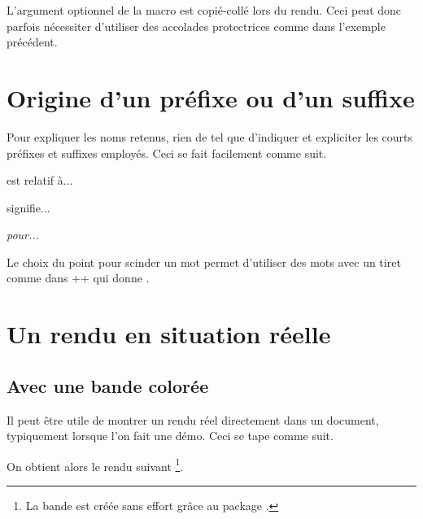 \begin{bdocwarn}
    L'argument optionnel de la macro  est copié-collé lors du rendu. Ceci peut donc parfois nécessiter d'utiliser des accolades protectrices comme dans l'exemple précédent.
\end{bdocwarn}




\section{Origine d'un préfixe ou d'un suffixe}

Pour expliquer les noms retenus, rien de tel que d'indiquer et expliciter les courts préfixes et suffixes employés. Ceci se fait facilement comme suit.

\begin{bdoclatex}[sbs]
 est relatif à...

 signifie...

\emph{ pour...}
\end{bdoclatex}


\begin{bdocrem}
    Le choix du point pour scinder un mot permet d'utiliser des mots avec un tiret comme dans \bdocinlatex++ qui donne .
\end{bdocrem}


\section{Un rendu en situation réelle} \label{bdoc-showcase}

\subsection{Avec une bande colorée}

\begin{bdocexa}
    Il peut être utile de montrer un rendu réel directement dans un document, typiquement lorsque l'on fait une démo.
    Ceci se tape comme suit.


    On obtient alors le rendu suivant
    \footnote{
        La bande est créée sans effort grâce au package .
    }.

    \medskip

    
\end{bdocexa}



